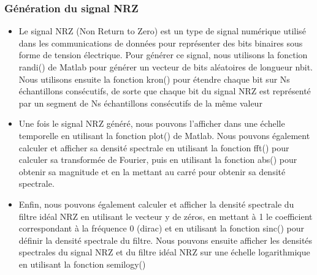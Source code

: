 \documentclass[frenchb]{article}
\begin{document}
        \subsubsection{Génération du signal NRZ}
            \begin{itemize}
                \item Le signal NRZ (Non Return to Zero) est un type de signal numérique utilisé dans les communications de données pour représenter des bits binaires sous forme de tension électrique. Pour générer ce signal, nous utilisons la fonction randi() de Matlab pour générer un vecteur de bits aléatoires de longueur nbit. Nous utilisons ensuite la fonction kron() pour étendre chaque bit sur Ns échantillons consécutifs, de sorte que chaque bit du signal NRZ est représenté par un segment de Ns échantillons consécutifs de la même valeur
                \item Une fois le signal NRZ généré, nous pouvons l'afficher dans une échelle temporelle en utilisant la fonction plot() de Matlab. Nous pouvons également calculer et afficher sa densité spectrale en utilisant la fonction fft() pour calculer sa transformée de Fourier, puis en utilisant la fonction abs() pour obtenir sa magnitude et en la mettant au carré pour obtenir sa densité spectrale.
                \item Enfin, nous pouvons également calculer et afficher la densité spectrale du filtre idéal NRZ en utilisant le vecteur y de zéros, en mettant à 1 le coefficient correspondant à la fréquence 0 (dirac) et en utilisant la fonction sinc() pour définir la densité spectrale du filtre. Nous pouvons ensuite afficher les densités spectrales du signal NRZ et du filtre idéal NRZ sur une échelle logarithmique en utilisant la fonction semilogy()
            \end{itemize}
        
                
            
\end{document}
